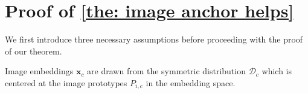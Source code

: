 





































































































\section{Proof of \cref{the: image anchor helps}}
\label{Appendix: Sec: Proof}

We first introduce three necessary assumptions before proceeding with the proof of our theorem.

\begin{assumption}\label{ass: ID from image prototypes}
Image embeddings $\mathbf{x}_{c}$ are drawn from the symmetric distribution $\mathcal{D}_c$ which is centered at the image prototypes $P_{i,c}$ in the embedding space. 
\end{assumption}

